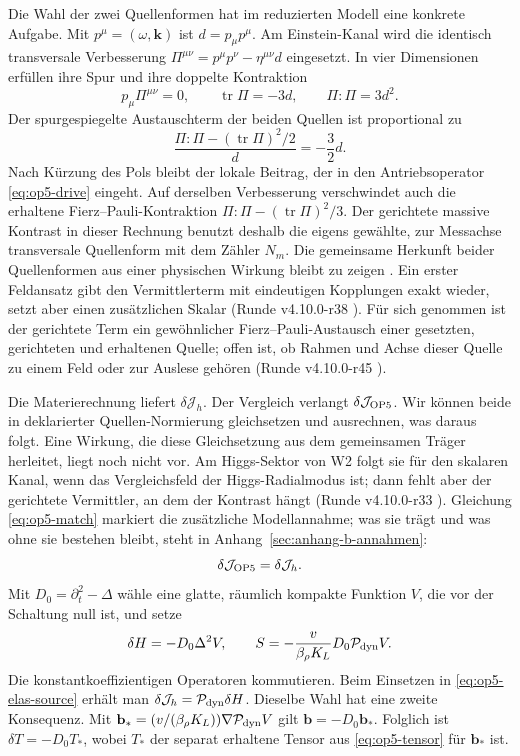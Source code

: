 Die Wahl der zwei Quellenformen hat im reduzierten Modell eine konkrete Aufgabe. Mit \(p^\mu=(\omega,\mathbf k)\) ist \(d=p_\mu p^\mu\). Am Einstein-Kanal wird die identisch transversale Verbesserung \(\Pi^{\mu\nu}=p^\mu p^\nu-\eta^{\mu\nu}d\) eingesetzt. In vier Dimensionen erfüllen ihre Spur und ihre doppelte Kontraktion
\[
 p_\mu \Pi^{\mu\nu}=0,\qquad
 \operatorname{tr}\Pi=-3d,\qquad \Pi:\Pi=3d^2 .
\]
Der spurgespiegelte Austauschterm der beiden Quellen ist proportional zu
\[
 \frac{\Pi:\Pi-(\operatorname{tr}\Pi)^2/2}{d}=-\frac32 d .
\]
Nach Kürzung des Pols bleibt der lokale Beitrag, der in den Antriebsoperator \eqref{eq:op5-drive} eingeht. Auf derselben Verbesserung verschwindet auch die erhaltene Fierz--Pauli-Kontraktion \(\Pi:\Pi-(\operatorname{tr}\Pi)^2/3\). Der gerichtete massive Kontrast in dieser Rechnung benutzt deshalb die eigens gewählte, zur Messachse transversale Quellenform mit dem Zähler \(N_m\). Die gemeinsame Herkunft beider Quellenformen aus einer physischen Wirkung bleibt zu zeigen \cite{op5-channel}. Ein erster Feldansatz gibt den Vermittlerterm mit eindeutigen Kopplungen exakt wieder, setzt aber einen zusätzlichen Skalar (Runde v4.10.0-r38 \cite{layers}). Für sich genommen ist der gerichtete Term ein gewöhnlicher Fierz--Pauli-Austausch einer gesetzten, gerichteten und erhaltenen Quelle; offen ist, ob Rahmen und Achse dieser Quelle zu einem Feld oder zur Auslese gehören (Runde v4.10.0-r45 \cite{layers}).

Die Materierechnung liefert \(\delta\mathcal J_h\). Der Vergleich verlangt \(\delta\mathcal J_{\rm OP5}\). Wir können beide in deklarierter Quellen-Normierung gleichsetzen und ausrechnen, was daraus folgt. Eine Wirkung, die diese Gleichsetzung aus dem gemeinsamen Träger herleitet, liegt noch nicht vor. Am Higgs-Sektor von W2 folgt sie für den skalaren Kanal, wenn das Vergleichsfeld der Higgs-Radialmodus ist; dann fehlt aber der gerichtete Vermittler, an dem der Kontrast hängt (Runde v4.10.0-r33 \cite{layers}). Gleichung \eqref{eq:op5-match} markiert die zusätzliche Modellannahme; was sie trägt und was ohne sie bestehen bleibt, steht in Anhang~\ref{sec:anhang-b-annahmen}:
\begin{equation}
 \delta\mathcal J_{\rm OP5}=\delta\mathcal J_h .
 \label{eq:op5-match}
\end{equation}
Mit \(D_0=\partial_t^2-\Delta\) wähle eine glatte, räumlich kompakte Funktion \(V\), die vor der Schaltung null ist, und setze
\begin{equation}
 \delta H=-D_0\Delta^2 V,\qquad
 S=-\frac{v}{\beta_\rho K_L}D_0\mathcal P_{\rm dyn}V .
 \label{eq:op5-profile}
\end{equation}
Die konstantkoeffizientigen Operatoren kommutieren. Beim Einsetzen in \eqref{eq:op5-elas-source} erhält man \(\delta\mathcal J_h=\mathcal P_{\rm dyn}\delta H\). Dieselbe Wahl hat eine zweite Konsequenz. Mit \(\mathbf b_*=(v/(\beta_\rho K_L))\nabla\mathcal P_{\rm dyn}V\) gilt \(\mathbf b=-D_0\mathbf b_*\). Folglich ist \(\delta T=-D_0 T_*\), wobei \(T_*\) der separat erhaltene Tensor aus \eqref{eq:op5-tensor} für \(\mathbf b_*\) ist.

